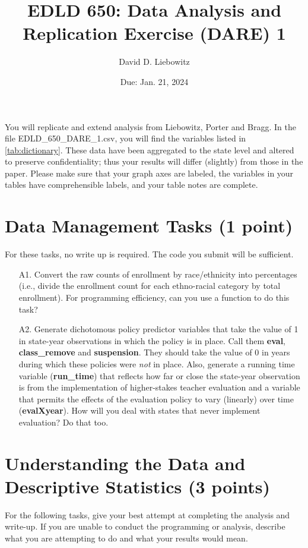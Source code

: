 \documentclass[a4paper, 11pt]{article}
\title{EDLD 650: Data Analysis and Replication Exercise (DARE) 1}
\author{David D. Liebowitz}
\date{Due: Jan. 21, 2024}
\begin{document}
\maketitle

You will replicate and extend analysis from Liebowitz, Porter and Bragg. In the file EDLD\_650\_DARE\_1.csv, you will find the variables listed in \autoref{tab:dictionary}. These data have been aggregated to the state level and altered to preserve confidentiality; thus your results will differ (slightly) from those in the paper. Please make sure that your graph axes are labeled, the variables in your tables have comprehensible labels, and your table notes are complete.



\section{Data Management Tasks (1 point)}
For these tasks, no write up is required. The code you submit will be sufficient.

\begin{enumerate}
	\item[A1.] Convert the raw counts of enrollment by race/ethnicity into percentages (i.e., divide the enrollment count for each ethno-racial category by total enrollment). For programming efficiency, can you use a function to do this task?
	\item[A2.] Generate dichotomous policy predictor variables that take the value of 1 in state-year observations in which the policy is in place. Call them \textbf{eval}, \textbf{class\_remove} and \textbf{suspension}. They should take the value of 0 in years during which these policies were \textit{not} in place. Also, generate a running time variable (\textbf{run\_time}) that reflects how far or close the state-year observation is from the implementation of higher-stakes teacher evaluation and a variable that permits the effects of the evaluation policy to vary (linearly) over time (\textbf{evalXyear}). How will you deal with states that never implement evaluation? Do that too.
\end{enumerate}

\section{Understanding the Data and Descriptive Statistics (3 points)}
For the following tasks, give your best attempt at completing the analysis and write-up. If you are unable to conduct the programming or analysis, describe what you are attempting to do and what your results would mean.
\end{document}
